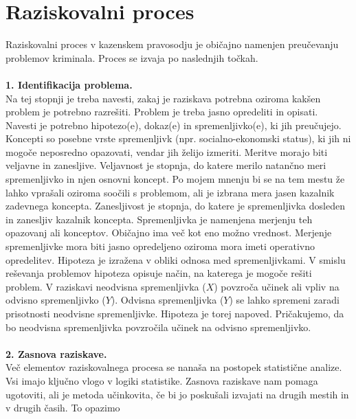 \documentclass[fin1, tisk]{fmfdelo}
\theoremstyle{definition}
\theoremstyle{trditev}
\theoremstyle{izrek}
\begin{document}
\section{Raziskovalni proces}
Raziskovalni proces v kazenskem pravosodju je običajno namenjen preučevanju problemov kriminala. Proces se izvaja po naslednjih točkah.\\\\
\textbf{1. Identifikacija problema.\\} 
Na tej stopnji je treba navesti, zakaj je raziskava potrebna oziroma kakšen problem je potrebno razrešiti. Problem je treba jasno 
opredeliti in opisati. Navesti je potrebno hipotezo(e), dokaz(e) in spremenljivko(e), ki jih preučujejo.\\
Koncepti so posebne vrste spremenljivk (npr. socialno-ekonomski status), ki jih ni mogoče neposredno opazovati, vendar jih želijo izmeriti. 
Meritve morajo biti veljavne in zanesljive. Veljavnost je stopnja, do katere merilo natančno meri spremenljivko in njen osnovni koncept. Po mojem 
mnenju bi se na tem mestu že lahko vprašali oziroma soočili s problemom, ali je izbrana mera jasen kazalnik zadevnega koncepta. Zanesljivost je 
stopnja, do katere je spremenljivka dosleden in zanesljiv kazalnik koncepta. Spremenljivka je namenjena merjenju teh opazovanj ali konceptov. 
Običajno ima več kot eno možno vrednost. Merjenje spremenljivke mora biti jasno opredeljeno oziroma mora imeti operativno opredelitev. Hipoteza je 
izražena v obliki odnosa med spremenljivkami. V smislu reševanja problemov hipoteza opisuje način, na katerega je mogoče rešiti problem. V raziskavi 
neodvisna spremenljivka ($X$) povzroča učinek ali vpliv na odvisno spremenljivko ($Y$). Odvisna spremenljivka ($Y$) se lahko spremeni zaradi prisotnosti 
neodvisne spremenljivke. Hipoteza je torej napoved. Pričakujemo, da bo neodvisna spremenljivka povzročila učinek na odvisno spremenljivko.\\\\
\textbf{2. Zasnova raziskave.\\} 
Več elementov raziskovalnega procesa se nanaša na postopek statistične analize. Vsi imajo ključno vlogo v logiki statistike. Zasnova raziskave 
nam pomaga ugotoviti, ali je metoda učinkovita, če bi jo poskušali izvajati na drugih mestih in v drugih časih. To opazimo 
\end{document}
